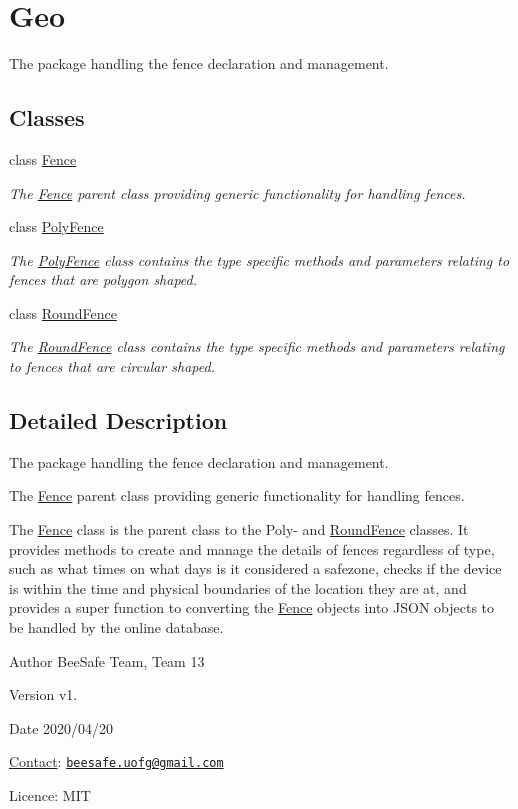 \hypertarget{group___geo}{}\section{Geo}
\label{group___geo}


The package handling the fence declaration and management.  


\subsection*{Classes}
\begin{DoxyCompactItemize}
\item 
class \hyperlink{class_fence}{Fence}
\begin{DoxyCompactList}\small\item\em The \hyperlink{class_fence}{Fence} parent class providing generic functionality for handling fences. \end{DoxyCompactList}\item 
class \hyperlink{class_poly_fence}{Poly\+Fence}
\begin{DoxyCompactList}\small\item\em The \hyperlink{class_poly_fence}{Poly\+Fence} class contains the type specific methods and parameters relating to fences that are polygon shaped. \end{DoxyCompactList}\item 
class \hyperlink{class_round_fence}{Round\+Fence}
\begin{DoxyCompactList}\small\item\em The \hyperlink{class_round_fence}{Round\+Fence} class contains the type specific methods and parameters relating to fences that are circular shaped. \end{DoxyCompactList}\end{DoxyCompactItemize}


\subsection{Detailed Description}
The package handling the fence declaration and management. 

The \hyperlink{class_fence}{Fence} parent class providing generic functionality for handling fences.

The \hyperlink{class_fence}{Fence} class is the parent class to the Poly-\/ and \hyperlink{class_round_fence}{Round\+Fence} classes. It provides methods to create and manage the details of fences regardless of type, such as what times on what days is it considered a safezone, checks if the device is within the time and physical boundaries of the location they are at, and provides a super function to converting the \hyperlink{class_fence}{Fence} objects into J\+S\+ON objects to be handled by the online database.

\begin{DoxyAuthor}{Author}
Bee\+Safe Team, Team 13
\end{DoxyAuthor}
\begin{DoxyVersion}{Version}
v1.
\end{DoxyVersion}
\begin{DoxyDate}{Date}
2020/04/20
\end{DoxyDate}
\hyperlink{class_contact}{Contact}\+: \href{mailto:beesafe.uofg@gmail.com}{\tt beesafe.\+uofg@gmail.\+com}

Licence\+: M\+IT 